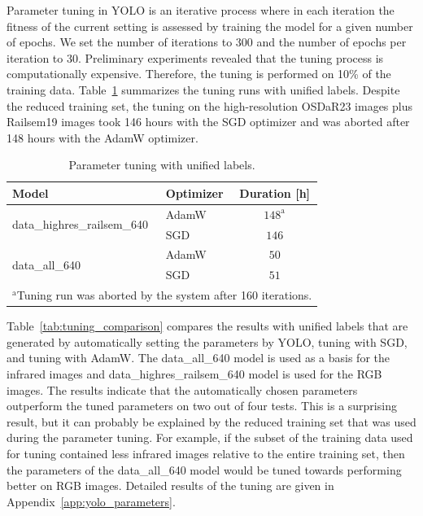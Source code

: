 \documentclass[Master,MDS,english]{BASE/twbook} %
\begin{document}
Parameter tuning in YOLO is an iterative process where in each iteration the fitness of the current setting is assessed by training the model for a given number of epochs. We set the number of iterations to 300 and the number of epochs per iteration to 30.  Preliminary experiments revealed that the tuning process is computationally expensive. Therefore, the tuning is performed on 10\% of the training data. 
Table~\ref{tab:model_duration} summarizes the tuning runs with unified labels. %
Despite the reduced training set, the tuning on the high-resolution OSDaR23 images plus Railsem19 images took 146 hours with the SGD optimizer and was aborted after 148 hours with the AdamW optimizer.  

\begin{table}[H]
\centering
\footnotesize
\begin{tabular}{|l|l|c|}
\hline
\textbf{Model} & \textbf{Optimizer} & \textbf{Duration [h]} \\ 
\hline
\multirow{2}{*}{data\_highres\_railsem\_640} & AdamW & $148^\mathrm{a}$\\
& SGD & $146$ \\
\hline
\multirow{2}{*}{data\_all\_640} & AdamW & $50$ \\
& SGD & $51$ \\
\hline
\multicolumn{3}{l}{$^{\mathrm{a}}$Tuning run was aborted by the system after 160 iterations.} \\
\end{tabular}
\caption{Parameter tuning with unified labels.}
\label{tab:model_duration}
\end{table}



Table~\ref{tab:tuning_comparison} compares the results with unified labels that are generated by automatically setting the parameters by YOLO, tuning with SGD, and tuning with AdamW. The data\_all\_640 model is used as a basis for the infrared images and data\_highres\_railsem\_640 model is used for the RGB images.
The results indicate that the automatically chosen parameters outperform the tuned parameters on two out of four tests. This is a surprising result, but it can probably be explained by the reduced training set that was used during the parameter tuning. For example, if the subset of the training data used for tuning contained less infrared images relative to the entire training set, then the parameters of the data\_all\_640 model would be tuned towards performing better on RGB images. Detailed results of the tuning are given in Appendix~\ref{app:yolo_parameters}.
\end{document}
